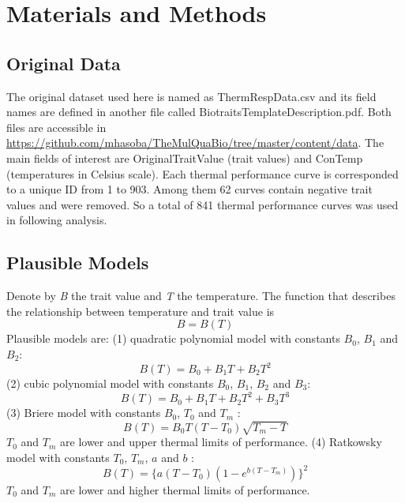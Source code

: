 \documentclass[11pt]{article}
\begin{document}
  \section{Materials and Methods}
    \subsection{Original Data}
    The original dataset used here is named as ThermRespData.csv and its field names are defined in another 
    file called BiotraitsTemplateDescription.pdf. Both files are accessible in 
    \newline 
    \href{https://github.com/mhasoba/TheMulQuaBio/tree/master/content/data}{https://github.com/mhasoba/TheMulQuaBio/tree/master/content/data}. 
    \newline 
    The main fields of interest are OriginalTraitValue (trait values) and ConTemp (temperatures 
    in Celsius scale). Each thermal performance curve is corresponded to a unique ID from 1 to 903. 
    Among them 62 curves contain negative trait values and were removed. 
    So a total of 841 thermal performance curves was used in following analysis. 
    
  \subsection{Plausible Models} 
    Denote by \textit{B} the trait value and \textit{T} the temperature. The function that describes 
    the relationship between temperature and trait value is  
    \begin{equation} 
      B = B(T) 
    \end{equation} 
    Plausible models are: (1) quadratic polynomial model with constants  
    $B_0$, $B_1$ and $B_2$: 
    \begin{equation} 
    B(T) = B_0 + B_1 T + B_2 T^2 
    \end{equation} 
    (2) cubic polynomial model with constants  
    $B_0$, $B_1$, $B_2$ and $B_3$: 
    \begin{equation} 
    B(T) = B_0 + B_1 T + B_2 T^2 + B_3 T^3 
    \end{equation} 
    (3) Briere model with constants  
    $B_0$, $T_0$ and $T_m$ 
    \cite{briere1999novel}: 
    \begin{equation}\label{equ:Briere} 
    B(T) = B_0 T (T - T_0) \sqrt{T_m - T} 
    \end{equation} 
    $T_0$ and $T_m$ are lower and upper thermal limits of performance. 
    \newline 
    (4) Ratkowsky model with constants  
    $T_0$, $T_m$, $a$ and $b$  
    \cite{ratkowsky1983model}: 
    \begin{equation} 
    B(T) = \{a (T-T_0) (1-e^{b(T-T_m)})\}^2 
    \end{equation} 
    $T_0$ and $T_m$ are lower and higher thermal limits of performance. 
\end{document}
